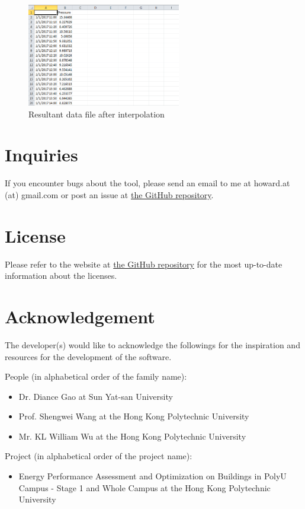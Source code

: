 \documentclass[12pt,a4paper]{article}
\begin{document}
\begin{figure}[H]
\centering
\includegraphics[width=0.6\textwidth]{missing_data_result.png}
\caption{Resultant data file after interpolation}
\label{fig:missing_data_result}
\end{figure}

\section{Inquiries}

If you encounter bugs about the tool, please send an email to me at howard.at (at) gmail.com or post an issue at \href{https://github.com/howardcheung/data-preprocessing-helper/}{the GitHub repository}.

\section{License}

Please refer to the website at \href{https://github.com/howardcheung/data-preprocessing-helper/}{the GitHub repository} for the most up-to-date information about the licenses.

\section{Acknowledgement}

The developer(s) would like to acknowledge the followings for the inspiration and resources for the development of the software.

People (in alphabetical order of the family name):
\begin{itemize}
\item Dr. Diance Gao at Sun Yat-san University
\item Prof. Shengwei Wang at the Hong Kong Polytechnic University
\item Mr. KL William Wu at the Hong Kong Polytechnic University
\end{itemize}

Project (in alphabetical order of the project name):
\begin{itemize}
\item Energy Performance Assessment and Optimization on Buildings in PolyU Campus - Stage 1 and Whole Campus at the Hong Kong Polytechnic University
\end{itemize}
\end{document}
